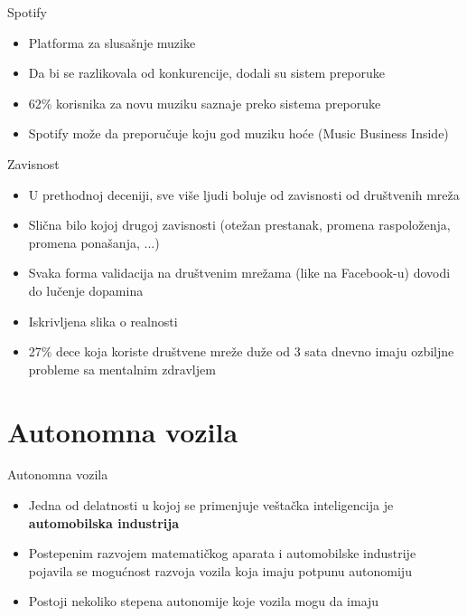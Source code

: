 \documentclass[14pt, aspectratio=169]{beamer}
\begin{document}
\begin{frame}{Spotify}
    \begin{itemize}
        \item Platforma za slusašnje muzike
        \item Da bi se razlikovala od konkurencije, dodali su sistem preporuke
        \item 62\% korisnika za novu muziku saznaje preko sistema preporuke
        \item Spotify može da preporučuje koju god muziku hoće (Music Business Inside)
    \end{itemize}
\end{frame}


\begin{frame}{Zavisnost}
    \begin{itemize}
        \item U prethodnoj deceniji, sve više ljudi boluje od zavisnosti od društvenih mreža
        \item Slična bilo kojoj drugoj zavisnosti (otežan prestanak, promena raspoloženja, promena ponašanja, ...)
        \item Svaka forma validacija na društvenim mrežama (like na Facebook-u) dovodi do lučenje dopamina
        \item Iskrivljena slika o realnosti
        \item 27\% dece koja koriste društvene mreže duže od 3 sata dnevno imaju ozbiljne probleme sa mentalnim zdravljem
    \end{itemize}
\end{frame}




\section{Autonomna vozila}

\begin{frame}{Autonomna vozila}
    \begin{itemize}
        \item Jedna od delatnosti u kojoj se primenjuje veštačka inteligencija je \textbf{automobilska industrija}
    \end{itemize}
    \begin{itemize}
        \item Postepenim razvojem matematičkog aparata i automobilske industrije pojavila se mogućnost razvoja vozila koja imaju potpunu autonomiju
    \end{itemize}
    \begin{itemize}
        \item Postoji nekoliko stepena autonomije koje vozila mogu da imaju
    \end{itemize}
\end{frame}
\end{document}
